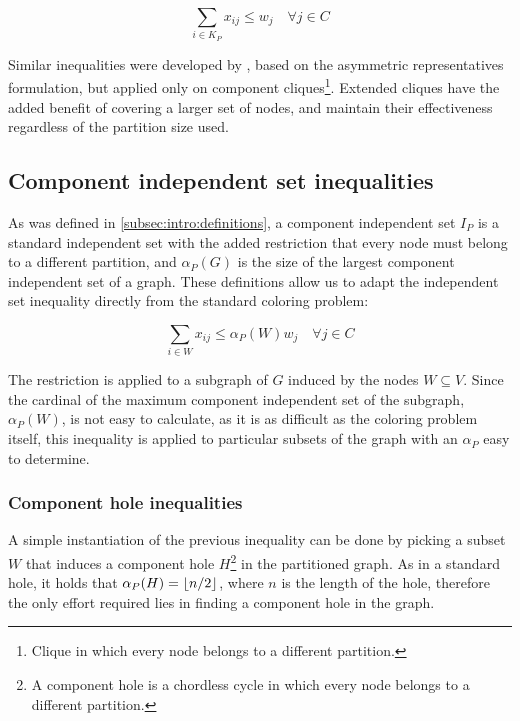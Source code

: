 \begin{equation}
\label{ineq:extendedclique}
\sum_{i \in K_P} x_{ij} \leq w_{j} \quad \forall j \in C
\end{equation}

Similar inequalities were developed by \cite{frota2010branch}, based on the asymmetric representatives formulation, but applied only on component cliques\footnote{Clique in which every node belongs to a different partition.}. Extended cliques have the added benefit of covering a larger set of nodes, and maintain their effectiveness regardless of the partition size used.

\subsection{Component independent set inequalities}

As was defined in \ref{subsec:intro:definitions}, a component independent set $I_P$ is a standard independent set with the added restriction that every node must belong to a different partition, and $\alpha_P(G)$ is the size of the largest component independent set of a graph. These definitions allow us to adapt the independent set inequality directly from the standard coloring problem:

\begin{equation}
\label{ineq:ciset}
\sum _{i \in W} x_{ij} \leq \alpha_P(W) w_{j} \quad \forall j \in C
\end{equation}

The restriction is applied to a subgraph of $G$ induced by the nodes $W \subseteq V$. Since the cardinal of the maximum component independent set of the subgraph, $\alpha_P(W)$, is not easy to calculate, as it is as difficult as the coloring problem itself, this inequality is applied to particular subsets of the graph with an $\alpha_P$ easy to determine.

\subsubsection{Component hole inequalities}

A simple instantiation of the previous inequality can be done by picking a subset $W$ that induces a component hole $H$\footnote{A component hole is a chordless cycle in which every node belongs to a different partition.} in the partitioned graph. As in a standard hole, it holds that $\alpha_P(H) = \left\lfloor n / 2 \right\rfloor$, where $n$ is the length of the hole, therefore the only effort required lies in finding a component hole in the graph.


